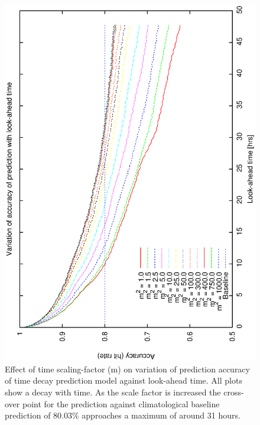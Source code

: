 \documentclass[12pt,a4paper]{article}
\begin{document}
{\begin{figure}[htbp] 
  \begin{center}
    \includegraphics[scale=0.4, angle=-90]{figures/ecs/gbc_predict.eps}
  \end{center}
  \caption[Accuracy of look-ahead weather prediction using time decay model against look-ahead time]
  {Effect of time scaling-factor (m) on variation of prediction accuracy of time decay prediction model against look-ahead time. All plots show a decay with time. As the scale factor is increased the cross-over point for the prediction against climatological baseline prediction of 80.03\% approaches a maximum of around 31 hours. }
  \label{fig:gbc_prediction}
\end{figure}

}
\end{document}
